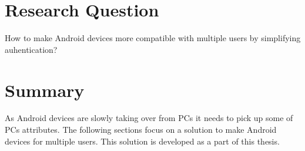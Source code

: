 \section{Research Question}
How to make Android devices more compatible with multiple users by simplifying auhentication?





\section{Summary}

As Android devices are slowly taking over from PCs it needs to pick up some of PCs attributes. The following sections focus on a solution to make Android devices for multiple users. This solution is developed as a part of this thesis.




